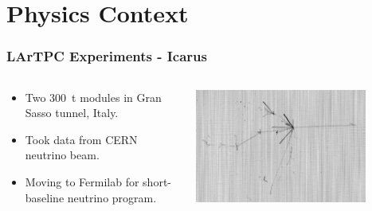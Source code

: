 \documentclass[xcolor=dvipsnames]{beamer}
\begin{document}




\section {Physics Context}

\begin{frame}
  \frametitle{}
  
\end{frame}

\begin{frame}
  \frametitle{LArTPC Experiments - Icarus}

  \begin{columns}
    \begin{column}{0.5\textwidth}
      \begin{itemize}
      \item Two \SI{300}{\tonne} modules in Gran Sasso tunnel, Italy.
      \item Took data from CERN neutrino beam.
      \item Moving to Fermilab for short-baseline neutrino program.
      \end{itemize}
    \end{column}
    \begin{column}{0.5\textwidth}
      \includegraphics[width=0.8\textwidth]{icarus.png}
    \end{column}
  \end{columns}
\end{frame}
\end{document}
